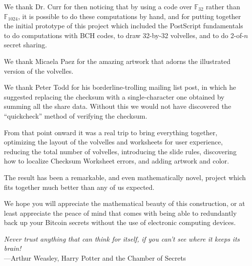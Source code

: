 \documentclass[letterpaper]{article}
\newcommand{\fttwo}{\mathbb{F}_{32}}
\begin{document}
We thank Dr. Curr for then noticing that by using a code over $\fttwo$
rather than $\mathbb{F}_{1024}$, it is possible to do these computations by hand,
and for putting together the initial prototype of this project which included
the PostScript fundamentals to do computations with BCH codes, to draw 32-by-32
volvelles, and to do 2-of-$n$ secret sharing.

We thank Micaela Paez for the amazing artwork that adorns the illustrated version
of the volvelles.

We thank Peter Todd for his borderline-trolling mailing list post, in which he
suggested replacing the checksum with a single-character one obtained by summing
all the share data. Without this we would not have discovered the ``quickcheck''
method of verifying the checksum.

From that point onward it was a real trip to bring everything together, optimizing
the layout of the volvelles and worksheets for user experience, reducing the
total number of volvelles, introducing the slide rules, discovering how to localize
Checksum Worksheet errors, and adding artwork and color.

The result has been a remarkable, and even mathematically novel, project which
fits together much better than any of us expected.

We hope you will appreciate the mathematical beauty of this construction, or
at least appreciate the peace of mind that comes with being able to redundantly
back up your Bitcoin secrets without the use of electronic computing devices.

\vfill
\begin{center}
\emph{Never trust anything that can think for itself, if you can’t see where it
keeps its brain!}\\
\hfill---Arthur Weasley, Harry Potter and the Chamber of Secrets
\end{center}
\end{document}
